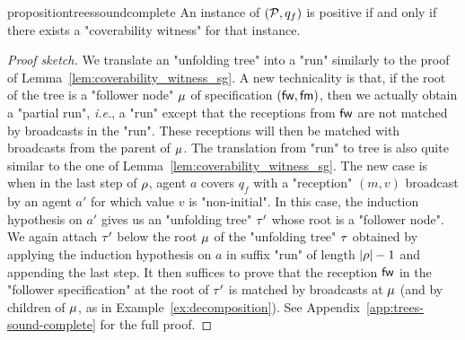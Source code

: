 \begin{restatable}{proposition}{treessoundcomplete}
	\label{prop:trees-sound-complete}
	An instance of \COVER $(\mathcal{P},q_f)$ is positive if and only if there exists a "coverability witness" for that instance.
\end{restatable}
\begin{proof}[Proof sketch]
	We translate an "unfolding tree" into a "run" similarly to the proof of Lemma~\ref{lem:coverability_witness_sg}. A new technicality is that, if the root of the tree is a "follower node" $\mu$ of specification $(\mathsf{fw}, \mathsf{fm})$, then we actually obtain a "partial run", \emph{i.e.}, a "run" except that the receptions from $\mathsf{fw}$ are not matched by broadcasts in the "run". These receptions will then be matched with broadcasts from the parent of $\mu$.
	The translation from "run" to tree is also quite similar to the one of Lemma~\ref{lem:coverability_witness_sg}. The new case is when in the last step of $\rho$, agent $a$ covers $q_f$ with a "reception" $(m,v)$ broadcast by an agent $a'$ for which value $v$ is "non-initial". 
	In this case, the induction hypothesis on $a'$ gives us an "unfolding tree" $\tau'$ whose root is a "follower node". We again attach $\tau'$ below the root $\mu$ of the "unfolding tree" $\tau$ obtained by applying the induction hypothesis on $a$ in suffix "run" of length $|\rho|-1$ and appending the last step. 
	It then suffices to prove that the reception $\mathsf{fw}$ in the "follower specification" at the root of $\tau'$ is matched by broadcasts at $\mu$ (and by children of $\mu$, as in Example~\ref{ex:decomposition}). See Appendix~\ref{app:trees-sound-complete} for the full proof.

\end{proof}
